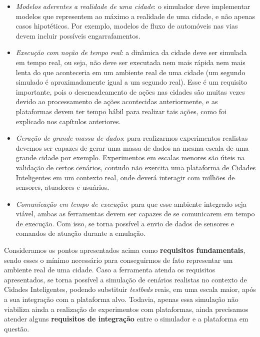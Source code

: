 \begin{itemize}
    \item \textit{Modelos aderentes a realidade de uma cidade}: o simulador deve implementar modelos que representem ao máximo a realidade de uma cidade, e não apenas casos hipotéticos.
        Por exemplo, modelos de fluxo de automóveis nas vias devem incluir possíveis engarrafamentos.

    \item \textit{Execução com noção de tempo real}: a dinâmica da cidade deve ser simulada em tempo real, ou seja, não deve ser executada nem mais rápida nem mais lenta do que aconteceria
        em um ambiente real de uma cidade (um segundo simulado é aproximadamente igual a um segundo real).
        Esse é um requisito importante, pois o desencadeamento de ações nas cidades são muitas vezes devido ao processamento de ações acontecidas anteriormente, e as plataformas
        devem ter tempo hábil para realizar tais ações, como foi explicado nos capítulos anteriores.

    \item \textit{Geração de grande massa de dados}: para realizarmos experimentos realistas devemos ser capazes de gerar uma massa de dados na mesma escala de uma grande cidade por
        exemplo.
        Experimentos em escalas menores são úteis na validação de certos cenários, contudo não exercita uma plataforma de Cidades Inteligentes em um contexto real, onde deverá
        interagir com milhões de sensores, atuadores e usuários.

    \item \textit{Comunicação em tempo de execução}: para que esse ambiente integrado seja viável, ambas as ferramentas devem ser capazes de se comunicarem em tempo de execução.
        Com isso, se torna possível a envio de dados de sensores e comandos de atuação durante a emulação.
\end{itemize}

Consideramos os pontos apresentados acima como \textbf{requisitos fundamentais}, sendo esses o mínimo necessário para conseguirmos de fato representar um ambiente real de uma cidade.
Caso a ferramenta atenda os requisitos apresentados, se torna possível a simulação de cenários realistas no contexto de Cidades Inteligentes, podendo substituir \textit{testbeds}
reais, em uma escala maior, após a sua integração com a plataforma alvo.
Todavia, apenas essa simulação não viabiliza ainda a realização de experimentos com plataformas, ainda precisamos atender alguns \textbf{requisitos de integração} entre o simulador
e a plataforma em questão.

